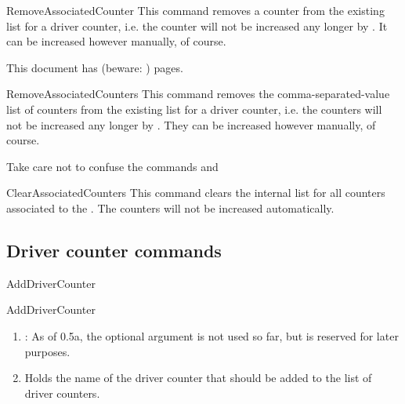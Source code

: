 \documentclass[12pt,paper=a4]{ltxdoc}
\def\packageversion{0.5a}%
\begin{document}
\begin{docCommand}{RemoveAssociatedCounter}{}
This command removes a counter from the existing list for a driver counter, i.e. the counter will not be increased any longer by . It can be increased however manually, of course. 
\end{docCommand}



\begin{dispExample}
This document has \number{} (beware: \number{}) pages.
\end{dispExample}



\begin{docCommand}{RemoveAssociatedCounters}{}
This command removes the comma-separated-value list of counters from the existing list for a driver counter, i.e. the counters will not be increased any longer by . They can be increased however manually, of course. 

Take care not to confuse the commands 
and{}\linebreak {}
\end{docCommand}

\begin{docCommand}{ClearAssociatedCounters}{}
This command clears the internal list for all counters associated to the . The counters will not be increased automatically.
\end{docCommand}


\clearpage


\subsection{Driver counter commands}


\begin{docCommand}{AddDriverCounter}{}

\begin{docCommandArgs}{AddDriverCounter}%

\begin{enumerate}[label={\textcolor{blue}{\#\arabic*}}]
\item {}: As of \packageversion, the optional argument  is not used so far, but is reserved for later purposes. 

  \item {} 

    Holds the name of the driver counter that should be added to the list of driver counters.
\end{enumerate}

\end{docCommandArgs}

\end{docCommand}%
\end{document}
